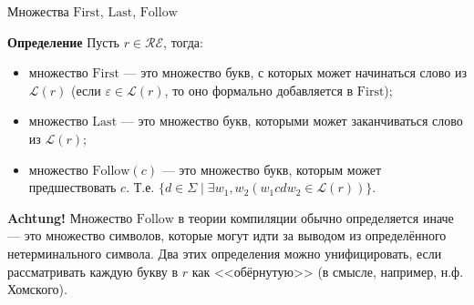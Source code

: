 \documentclass[mathserif]{beamer}
\newcommand{\Lang}{\mathscr{L}} %
\def\First{\mathrm{First}} %
\def\Last{\mathrm{Last}}
\def\Follow{\mathrm{Follow}}
\newcommand{\empt}{\varepsilon} %
\newcommand{\RegExp}{\mathcal{RE}} %
\begin{document}
\begin{frame}{Множества $\First$, $\Last$, $\Follow$}
    \vspace{-5pt}%
    \begin{block}{\bf Определение}
        Пусть $r\in\RegExp$, тогда:
        \begin{itemize}
            \item множество $\First$ --- это множество букв, с которых может начинаться слово из $\Lang(r)$ (если $\empt\in\Lang(r)$, то оно формально добавляется в $\First$);
            \item множество $\Last$ --- это множество букв, которыми может заканчиваться слово из $\Lang(r)$;
            \item множество $\Follow(c)$ --- это множество букв, которым может предшествовать $c$. Т.е. $\bigl\lbrace d\in\Sigma\mid \exists w_1,w_2(w_1 c d w_2\in\Lang(r))\bigr\rbrace$.
        \end{itemize}
    \end{block} %

    \begin{alertblock}{\bf Achtung!}
        \small
        Множество $\Follow$ в теории компиляции обычно определяется иначе --- это множество символов, которые могут идти за выводом из определённого нетерминального символа. Два этих определения можно унифицировать, если рассматривать каждую букву в $r$ как <<обёрнутую>> (в смысле, например, н.ф. Хомского).
    \end{alertblock} %
\end{frame}
\end{document}
